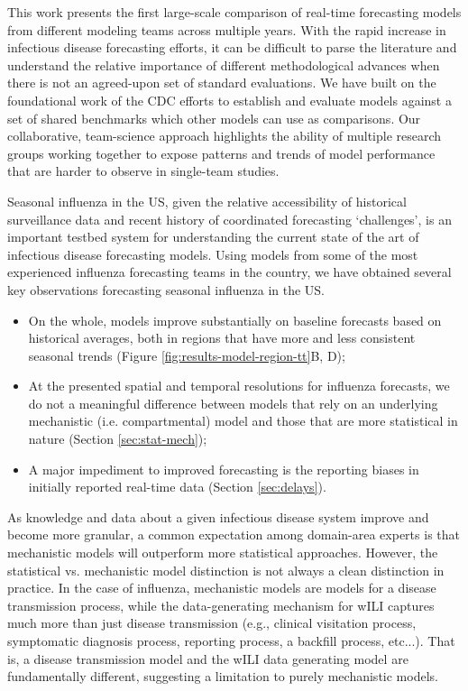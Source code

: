 \documentclass{article}\usepackage[]{graphicx}\usepackage[]{color}
\begin{document}
This work presents the first large-scale comparison of real-time forecasting models from different modeling teams across multiple years.
With the rapid increase in infectious disease forecasting efforts, it can be difficult to parse the literature and understand the relative importance of different methodological advances when there is not an agreed-upon set of standard evaluations.
We have built on the foundational work of the CDC efforts to establish and evaluate models against a set of shared benchmarks which other models can use as comparisons.
Our collaborative, team-science approach highlights the ability of multiple research groups working together to expose patterns and trends of model performance that are harder to observe in single-team studies.

Seasonal influenza in the US, given the relative accessibility of historical surveillance data and recent history of coordinated forecasting `challenges', is an important testbed system for understanding the current state of the art of infectious disease forecasting models.
Using models from some of the most experienced influenza forecasting teams in the country, we have obtained several key observations forecasting seasonal influenza in the US. 
\begin{itemize}
    \item On the whole, models improve substantially on baseline forecasts based on historical averages, both in regions that have more and less consistent seasonal trends (Figure \ref{fig:results-model-region-tt}B, D);
    \item At the presented spatial and temporal resolutions for influenza forecasts, we do not a meaningful difference between models that rely on an underlying mechanistic (i.e. compartmental) model and those that are more statistical in nature (Section \ref{sec:stat-mech});
    \item A major impediment to improved forecasting is the reporting biases in initially reported real-time data (Section \ref{sec:delays}).
\end{itemize}

As knowledge and data about a given infectious disease system improve and become more granular, a common expectation among domain-area experts is that mechanistic models will outperform more statistical approaches.
However, the statistical vs. mechanistic model distinction is not always a clean distinction in practice.
In the case of influenza, mechanistic models are models for a disease transmission process, while the data-generating mechanism for wILI captures much more than just disease transmission (e.g., clinical visitation process, symptomatic diagnosis process, reporting process, a backfill process, etc...). 
That is, a disease transmission model and the wILI data generating model are fundamentally different, suggesting a limitation to purely mechanistic models.
\end{document}
